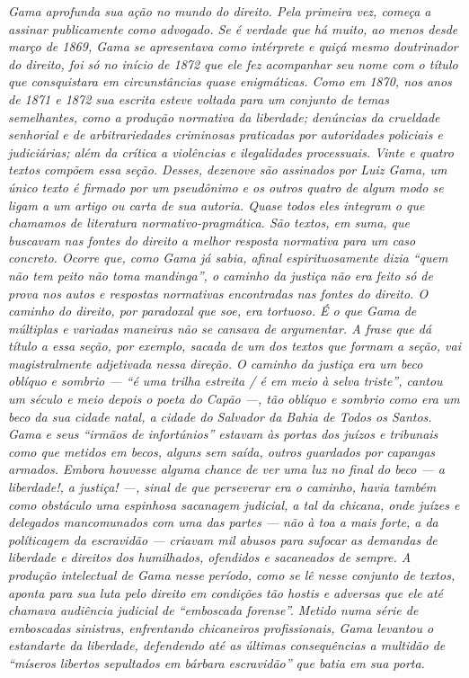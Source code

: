 \begin{argumento}
\emph{Gama aprofunda sua ação no mundo do direito. Pela primeira vez,
começa a assinar publicamente como advogado. Se é verdade que há muito,
ao menos desde março de 1869, Gama se apresentava como intérprete e
quiçá mesmo doutrinador do direito, foi só no início de 1872 que ele fez
acompanhar seu nome com o título que consquistara em circunstâncias
quase enigmáticas. Como em 1870, nos anos de 1871 e 1872 sua escrita
esteve voltada para um conjunto de temas semelhantes, como a produção
normativa da liberdade; denúncias da crueldade senhorial e de
arbitrariedades criminosas praticadas por autoridades policiais e
judiciárias; além da crítica a violências e ilegalidades processuais.
Vinte e quatro textos compõem essa seção. Desses, dezenove são assinados
por Luiz Gama, um único texto é firmado por um pseudônimo e os outros
quatro de algum modo se ligam a um artigo ou carta de sua autoria. Quase
todos eles integram o que chamamos de literatura normativo-pragmática.
São textos, em suma, que buscavam nas fontes do direito a melhor
resposta normativa para um caso concreto. Ocorre que, como Gama já
sabia, afinal espirituosamente dizia ``quem não tem peito não toma
mandinga'', o caminho da justiça não era feito só de prova nos autos e
respostas normativas encontradas nas fontes do direito. O caminho do
direito, por paradoxal que soe, era tortuoso. É o que Gama de múltiplas
e variadas maneiras não se cansava de argumentar. A frase que dá título
a essa seção, por exemplo, sacada de um dos textos que formam a seção,
vai magistralmente adjetivada nessa direção. O caminho da justiça era um
beco oblíquo e sombrio --- ``é uma trilha estreita / é em meio à selva
triste'', cantou um século e meio depois o poeta do Capão ---, tão oblíquo
e sombrio como era um beco da sua cidade natal, a cidade do Salvador da
Bahia de Todos os Santos. Gama e seus ``irmãos de infortúnios'' estavam às
portas dos juízos e tribunais como que metidos em becos, alguns sem
saída, outros guardados por capangas armados. Embora houvesse alguma
chance de ver uma luz no final do beco --- a liberdade!, a justiça! ---,
sinal de que perseverar era o caminho, havia também como obstáculo uma
espinhosa sacanagem judicial, a tal da chicana, onde juízes e delegados
mancomunados com uma das partes --- não à toa a mais forte, a da
políticagem da escravidão --- criavam mil abusos para sufocar as demandas
de liberdade e direitos dos humilhados, ofendidos e sacaneados de
sempre. A produção intelectual de Gama nesse período, como se lê nesse
conjunto de textos, aponta para sua luta pelo direito em condições tão
hostis e adversas que ele até chamava audiência judicial de ``emboscada
forense''. Metido numa série de emboscadas sinistras, enfrentando
chicaneiros profissionais, Gama levantou o estandarte da liberdade,
defendendo até as últimas consequências a multidão de ``míseros libertos
sepultados em bárbara escravidão'' que batia em sua porta.}
\end{argumento}

